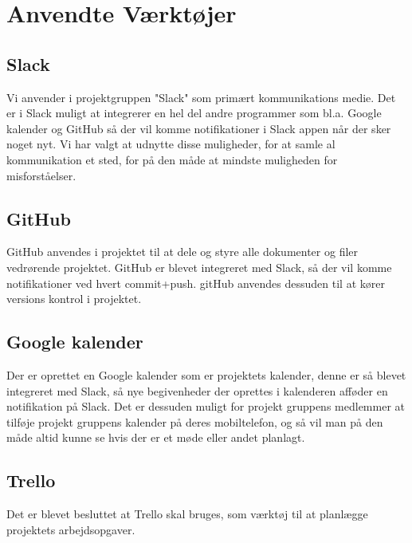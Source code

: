 \chapter{Anvendte Værktøjer}
\section{Slack}
Vi anvender i projektgruppen "Slack" som primært kommunikations medie. Det er i Slack muligt at integrerer en hel del andre programmer som bl.a. Google kalender og GitHub så der vil komme notifikationer i Slack appen når der sker noget nyt. Vi har valgt at udnytte disse muligheder, for at samle al kommunikation et sted, for på den måde at mindste muligheden for misforståelser.
\section{GitHub}
GitHub anvendes i projektet til at dele og styre alle dokumenter og filer vedrørende projektet. GitHub er blevet integreret med Slack, så der vil komme notifikationer ved hvert commit+push. gitHub anvendes dessuden til at kører versions kontrol i projektet.
\section{Google kalender}
Der er oprettet en Google kalender som er projektets kalender, denne er så blevet integreret med Slack, så nye begivenheder der oprettes i kalenderen afføder en notifikation på Slack. Det er dessuden muligt for projekt gruppens medlemmer at tilføje projekt gruppens kalender på deres mobiltelefon, og så vil man på den måde altid kunne se hvis der er et møde eller andet planlagt.
\section{Trello}
Det er blevet besluttet at Trello skal bruges, som værktøj til at planlægge projektets arbejdsopgaver.
